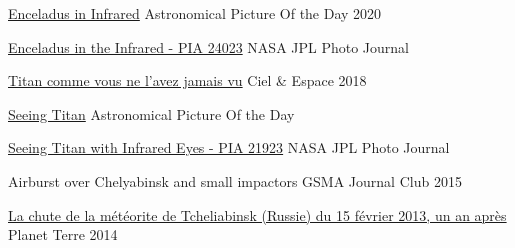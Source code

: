 
\begin{cvhonors}
    \cvhonor
	{\href{https://apod.nasa.gov/apod/ap200924.html}{Enceladus in Infrared}}
	{}
	{Astronomical Picture Of the Day}
	{2020}

	\cvhonor
	{\href{https://www.jpl.nasa.gov/spaceimages/details.php?id=PIA24023}{Enceladus in the Infrared - PIA 24023}}
	{}
	{NASA JPL Photo Journal}
	{}

	\cvhonor
	{\href{https://www.cieletespace.fr/actualites/titan-comme-vous-ne-l-avez-jamais-vu}{Titan comme vous ne l'avez jamais vu}}
	{}
	{Ciel \& Espace}
	{2018}

    \cvhonor
	{\href{https://apod.nasa.gov/apod/ap180818.html}{Seeing Titan}}
	{}
	{Astronomical Picture Of the Day}
	{}

	\cvhonor
	{\href{https://www.jpl.nasa.gov/spaceimages/details.php?id=PIA21923}{Seeing Titan with Infrared Eyes - PIA 21923}}
	{}
	{NASA JPL Photo Journal}
	{}

    \cvhonor
	{Airburst over Chelyabinsk and small impactors}
	{}
	{GSMA Journal Club}
	{2015}

	\cvhonor
	{\href{{http://planet-terre.ens-lyon.fr/article/meteorite-Tcheliabinsk.xml}}{La chute de la météorite de Tcheliabinsk (Russie) du 15 février 2013, un an après}}
	{}
	{Planet Terre}
	{2014}

\end{cvhonors}
